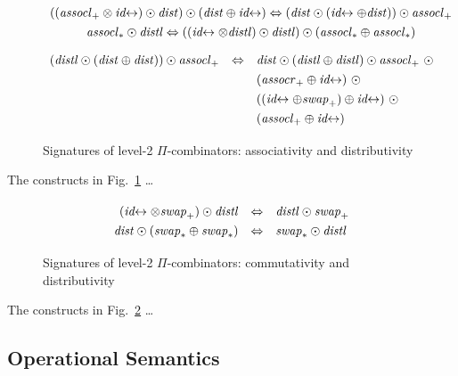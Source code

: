 \documentclass{article}
\newcommand{\swapp}{\mathit{swap}_+}
\newcommand{\assoclp}{\mathit{assocl}_+}
\newcommand{\assocrp}{\mathit{assocr}_+}
\newcommand{\swapt}{\mathit{swap}_*}
\newcommand{\assoclt}{\mathit{assocl}_*}
\newcommand{\dist}{\mathit{dist}}
\newcommand{\distl}{\mathit{distl}}
\newcommand{\idc}{\mathit{id}\!\!\leftrightarrow}
\begin{document}
\begin{figure}[tb]
\[\def\arraystretch{1.3}
\begin{array}{c}
  {((\assoclp \otimes \idc) \odot \dist) \odot (\dist \oplus \idc) \Leftrightarrow (\dist \odot (\idc \oplus \dist)) \odot \assoclp}
\\
  {\assoclt \odot \distl \Leftrightarrow ((\idc \otimes \distl) \odot \distl) \odot (\assoclt \oplus \assoclt)}
\end{array}\]
\vspace{ -0.5em}
\[\def\arraystretch{1.3}
\begin{array}{rcl}
  (\distl \odot (\dist \oplus \dist)) \odot \assoclp &\Leftrightarrow&
   \dist \odot (\distl \oplus \distl) \odot \assoclp ~\odot \\
&& (\assocrp \oplus \idc) ~\odot \\
&& ((\idc \oplus \swapp) \oplus \idc) ~\odot \\
&&      (\assoclp \oplus \idc)
\end{array}\]
\caption{\label{figb}Signatures of level-2 $\Pi$-combinators: associativity and distributivity}
\end{figure}

The constructs in Fig.~\ref{figb} \ldots 
\begin{center}
\begin{tikzpicture}[scale=0.7,every node/.style={scale=0.8}]
\end{tikzpicture}
\end{center}

\begin{figure}[tb]
\[\def\arraystretch{1.3}
\begin{array}{rcl}
  (\idc \otimes \swapp) \odot \distl &\Leftrightarrow& \distl \odot \swapp
\\
  \dist \odot (\swapt \oplus \swapt) &\Leftrightarrow & \swapt \odot \distl
\end{array}\]
\caption{\label{figa}Signatures of level-2 $\Pi$-combinators: commutativity and distributivity}
\end{figure}

The constructs in Fig.~\ref{figa} \ldots 
\begin{center}
\begin{tikzpicture}[scale=0.7,every node/.style={scale=0.8}]
\end{tikzpicture}
\end{center}

\subsection{Operational Semantics} 
\end{document}
